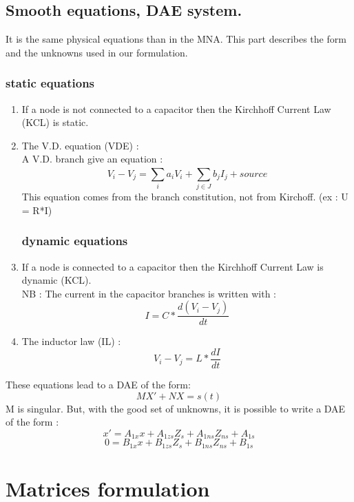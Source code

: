 \subsection{Smooth equations, DAE system.}
It is the same physical equations than in the MNA. This part describes the form and the unknowns
used in our formulation.
\subsubsection{static equations}
\begin{enumerate}
  \item If a node is not connected to a capacitor then the Kirchhoff Current Law (KCL) is static. \\
  \item The V.D. equation (VDE) : \\
    A V.D. branch give an equation :
    \[V_{i}-V_{j} = \sum_{i}^{}a_{i}V_{i} + \sum_{j\in J}^{}b_{j}I_{j} +   source\]
    This equation comes from the branch constitution, not from Kirchoff. (ex : U = R*I)
\subsubsection{dynamic equations}
  \item If a node is connected to a capacitor then the Kirchhoff Current Law is dynamic (KCL).\\
    NB : The current in the capacitor branches is written with :
    \[I = C*\frac{d(V_{i} - V_{j})}{dt}\]
  \item The inductor law (IL) : 
     \[V_{i} - V_{j} = L*\frac{dI}{dt}\]
\end{enumerate}

These equations lead to a DAE of the form:
\[MX'+NX=s(t)\]
M is singular. But, with the good set of unknowns, it is possible to write a DAE of the form :
\[x' = A_{1x}x +A_{1zs}Z_{s} + A_{1ns}Z_{ns}+A_{1s}\]
\[0  = B_{1x}x+B_{1zs}Z_{s} + B_{1ns}Z_{ns}+B_{1s}\]


\newpage
\section{Matrices formulation}


